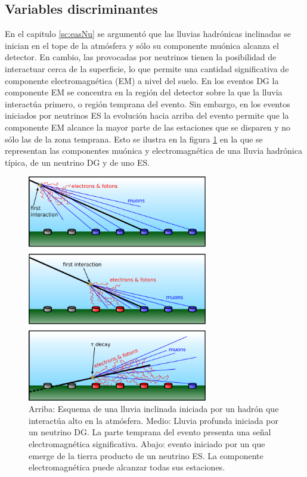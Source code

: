 	\subsection{Variables discriminantes}
	\label{sbsc:discVars}
	
	En el capitulo \ref{sc:easNu} se argumentó que las lluvias hadrónicas inclinadas se inician en el tope de la atmósfera y sólo su componente muónica alcanza el detector.
	En cambio, las provocadas por neutrinos tienen la posibilidad de interactuar cerca de la superficie, lo que permite una cantidad significativa de componente electromagnética (EM) a nivel del suelo.
	En los eventos DG la componente EM se concentra en la región del detector sobre la que la lluvia interactúa primero, o regi\'on temprana del evento.
	Sin embargo, en los eventos iniciados por neutrinos ES la evolución hacia arriba del evento permite que la componente EM alcance la mayor parte de las estaciones que se disparen y no sólo las de la zona temprana.
	Esto se ilustra en la figura \ref{fig:compNus} en la que se representan las componentes muónica y electromagnética de una lluvia hadrónica típica, de un neutrino DG y de uno ES.
	\begin{figure}[ht!]
		\begin{center}
		\includegraphics[width=0.7\textwidth]{fig/seleccionAuger/inclined_regular_dg_and_up}
		\caption{Arriba: Esquema de una lluvia inclinada iniciada por un hadrón que interactúa alto en la atmósfera. Medio: Lluvia profunda iniciada por un neutrino DG. La parte temprana del evento presenta una señal electromagnética significativa. Abajo: evento iniciado por un \tauon{} que emerge de la tierra producto de un neutrino ES. La componente electromagnética puede alcanzar todas sus estaciones.}
		\label{fig:compNus}
		\end{center}
	\end{figure}
	
